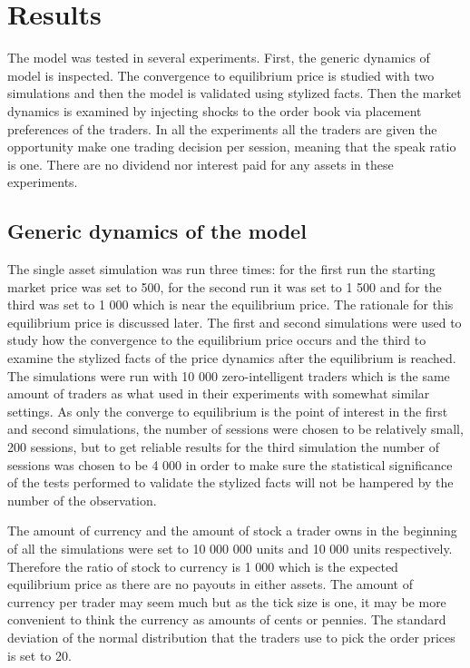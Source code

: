 
\section{Results}

The model was tested in several experiments. First, the generic dynamics of %
model is inspected. The convergence to equilibrium price is studied with two
simulations and then the model is validated using stylized facts. Then the
market dynamics is examined by injecting shocks to the order book via placement 
preferences of the traders. In all the experiments all the traders are given the 
opportunity make one trading decision per session, meaning that the speak ratio 
is one. There are no dividend nor interest paid for any assets in these experiments.

\subsection{Generic dynamics of the model}
The single asset simulation was run three times: for the first run
the starting market price was set to 500, for the second run it
was set to 1 500 and for the third was set to 1 000 which is near the equilibrium price. 
The rationale for this equilibrium price is discussed later.
The first and second simulations were
used to study how the convergence to the equilibrium price occurs
and the third to examine the stylized facts of the price
dynamics after the equilibrium is reached. The simulations were
run with 10 000 zero-intelligent traders which is the 
same amount of traders as what \citet{Raberto05} used in their experiments
with somewhat similar settings. As only the converge to equilibrium is 
the point of interest in the first and second simulations, the number of sessions
were chosen to be relatively small, 200 sessions, but to get reliable results for
the third simulation the number of sessions was chosen to be 4 000 in order to 
make sure the statistical significance of the tests performed to validate the 
stylized facts will not be hampered by the number of the observation.

The amount of currency and the amount of stock 
a trader owns in the beginning of all the simulations were set to
10 000 000 units and 10 000 units respectively. Therefore
the ratio of stock to currency is 1 000 which
is the expected equilibrium price as there are
no payouts in either assets. The amount of currency
per trader may seem much but as the tick size is one,
it may be more convenient to think the currency as amounts
of cents or pennies. The standard deviation of
the normal distribution that the traders use to pick the order prices
is set to 20.

